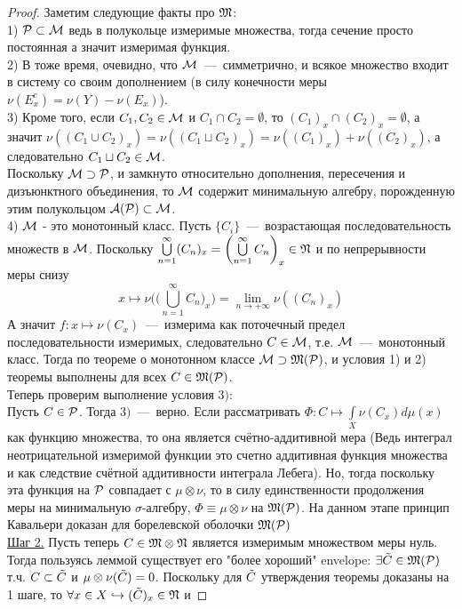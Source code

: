 \begin{proof}
    Заметим следующие факты про $\mathfrak{M}$: \\
    1)  $\mathcal{P} \subset \mathcal{M} $ ведь в полукольце измеримые множества, тогда сечение просто постоянная а значит измеримая функция.\\
    2) В тоже время, очевидно, что $\mathcal{M}$~---~симметрично, и всякое множество входит в систему со своим дополнением (в силу конечности меры $\nu(E_x^c) = \nu(Y) - \nu(E_x)$). \\
    3) Кроме того, если $C_1, C_2 \in \mathcal{M}$ и $C_1 \cap C_2 = \emptyset$, то $(C_1)_x \cap (C_2)_x = \emptyset$, а значит $\nu((C_1 \cup C_2)_x) = \nu((C_1 \sqcup C_2)_x) = \nu((C_1)_x) + \nu((C_2)_x)$, а следовательно $C_1 \sqcup C_2 \in \mathcal{M}$. \\
    Поскольку $\mathcal{M} \supset \mathcal{P}$, и замкнуто относительно дополнения, пересечения и дизъюнктного объединения, то $\mathcal{M}$ содержит минимальную алгебру, порожденную этим полукольцом $\mathcal{A}(\mathcal{P})\subset\mathcal{M} $. \\
    4) $\mathcal{M}$ - это монотонный класс. Пусть $\{C_i\}$~---~возрастающая последовательность множеств в $\mathcal{M}$. Поскольку $\bigcup\limits_{n = 1}^\infty (C_n)_x = \biggl(\bigcup\limits_{n = 1}^\infty C_n\biggr)_x \in \mathfrak{N}$ и по непрерывности меры снизу \[x \mapsto \nu\biggl(\biggl(\bigcup\limits_{n = 1}^\infty C_n\biggr)_x\biggr) = \lim\limits_{n \rightarrow +\infty} \nu((C_n)_x)\]
    А значит $f: x \mapsto \nu(C_x)$~---~измерима как поточечный предел последовательности измеримых, следовательно $C \in \mathcal{M}$, т.е. $\mathcal{M}$~---~монотонный класс. Тогда по теореме о монотонном классе $\mathcal{M} \supset \mathfrak{M}(\mathcal{P})$, и условия 1) и 2) теоремы выполнены для всех $C \in \mathfrak{M}(\mathcal{P})$. \\
    Теперь проверим выполнение условия $3)$:\\ Пусть $C \in \mathcal{P}$. Тогда $3)$~---~верно. Если рассматривать $\Phi: C \mapsto \int\limits_{X} \nu(C_x)d\mu(x)$ как функцию множества, то она является счётно-аддитивной мера (Ведь интеграл неотрицательной измеримой функции это счетно аддитивная функция множества и как следствие счётной аддитивности интеграла Лебега). Но, тогда поскольку эта функция на $\mathcal{P}$ совпадает с $\mu\otimes\nu$, то в силу единственности продолжения меры на минимальную $\sigma$-алгебру, $\Phi \equiv \mu\otimes\nu$ на $\mathfrak{M}(\mathcal{P})$. На данном этапе принцип Кавальери доказан для борелевской оболочки $\mathfrak{M}(\mathcal{P})$ \\
    \underline{Шаг 2.} Пусть теперь $C \in \mathfrak{M} \otimes \mathfrak{N}$ является измеримым множеством меры нуль. Тогда пользуясь леммой существует его "более хороший" envelope: $\exists \Tilde{C} \in \mathfrak{M}(\mathcal{P})$ т.ч. $ C \subset\Tilde{C} $ и $\mu\otimes\nu(\Tilde{C}) = 0$. Поскольку для $\Tilde{C}$ утверждения теоремы доказаны на 1 шаге, то $\forall x \in X \hookrightarrow (\Tilde{C})_x \in \mathfrak{N}$ и 

\end{proof}
